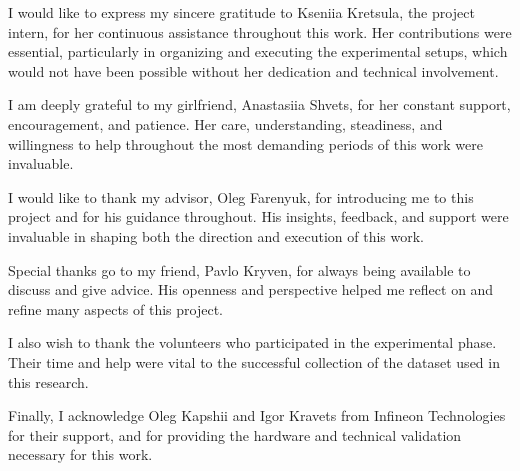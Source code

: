 \begin{acknowledgment}
\addchaptertocentry{\acknowledgmentname}

\setlength{\parskip}{\baselineskip}

I would like to express my sincere gratitude to Kseniia Kretsula, the project intern, for her continuous assistance throughout this work. Her contributions were essential, particularly in organizing and executing the experimental setups, which would not have been possible without her dedication and technical involvement.

I am deeply grateful to my girlfriend, Anastasiia Shvets, for her constant support, encouragement, and patience. Her care, understanding, steadiness, and willingness to help throughout the most demanding periods of this work were invaluable.

I would like to thank my advisor, Oleg Farenyuk, for introducing me to this project and for his guidance throughout. His insights, feedback, and support were invaluable in shaping both the direction and execution of this work.

Special thanks go to my friend, Pavlo Kryven, for always being available to discuss and give advice. His openness and perspective helped me reflect on and refine many aspects of this project.

I also wish to thank the volunteers who participated in the experimental phase. Their time and help were vital to the successful collection of the dataset used in this research.

Finally, I acknowledge Oleg Kapshii and Igor Kravets from Infineon Technologies for their support, and for providing the hardware and technical validation necessary for this work.

\end{acknowledgment}
